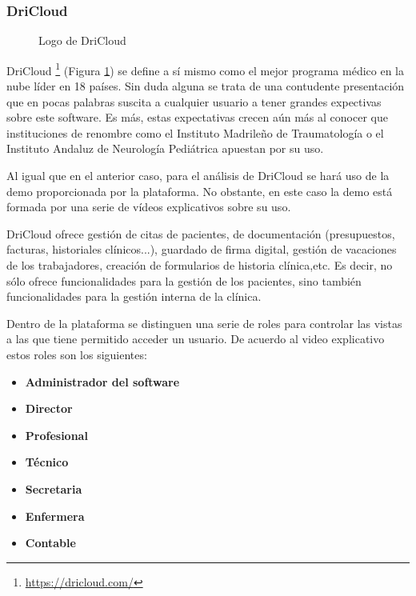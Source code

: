 \subsubsection*{DriCloud}

\begin{figure}[H]
    \caption{Logo de DriCloud}
    \label{fig:dricloud-logo}
\end{figure}

DriCloud \footnote{\url{https://dricloud.com/}} (Figura \ref{fig:dricloud-logo}) se define a sí mismo como  el mejor programa médico en la nube líder en 18 países. Sin duda alguna se trata de una contudente presentación que en pocas palabras suscita a cualquier usuario a tener grandes expectivas sobre este software. Es más, estas expectativas crecen aún más al conocer que instituciones de renombre como el Instituto Madrileño de Traumatología o el Instituto Andaluz de Neurología Pediátrica apuestan por su uso. \bigskip

Al igual que en el anterior caso, para el análisis de DriCloud se hará uso de la demo proporcionada por la plataforma. No obstante, en este caso la demo está formada por una serie de vídeos explicativos sobre su uso. \bigskip

DriCloud ofrece gestión de citas de pacientes, de documentación (presupuestos, facturas, historiales clínicos...), guardado de firma digital, gestión de vacaciones de los trabajadores, creación de formularios de historia clínica,etc. Es decir, no sólo ofrece funcionalidades para la gestión de los pacientes, sino también funcionalidades para la gestión interna de la clínica. \bigskip

Dentro de la plataforma se distinguen una serie de roles para controlar las vistas a las que tiene permitido acceder un usuario. De acuerdo al video explicativo estos roles son los siguientes:

\begin{itemize}
    \item \textbf{Administrador del software}
    \item \textbf{Director}
    \item \textbf{Profesional}
    \item \textbf{Técnico} 
    \item \textbf{Secretaria}
    \item \textbf{Enfermera}
    \item \textbf{Contable}
\end{itemize}

